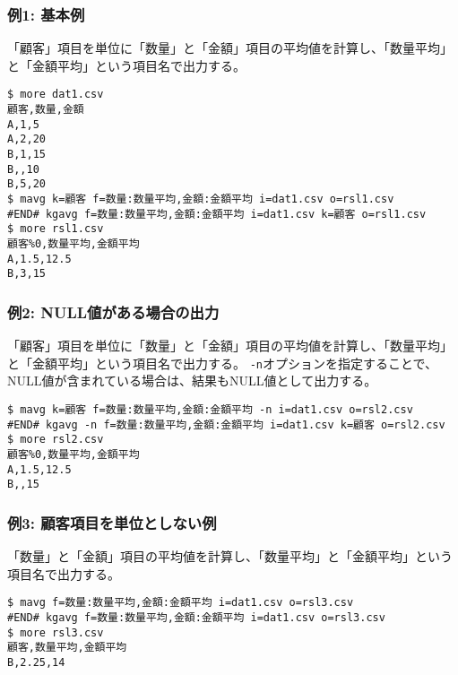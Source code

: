 \subsubsection*{例1: 基本例}

「顧客」項目を単位に「数量」と「金額」項目の平均値を計算し、「数量平均」と「金額平均」という項目名で出力する。


\begin{Verbatim}[baselinestretch=0.7,frame=single]
$ more dat1.csv
顧客,数量,金額
A,1,5
A,2,20
B,1,15
B,,10
B,5,20
$ mavg k=顧客 f=数量:数量平均,金額:金額平均 i=dat1.csv o=rsl1.csv
#END# kgavg f=数量:数量平均,金額:金額平均 i=dat1.csv k=顧客 o=rsl1.csv
$ more rsl1.csv
顧客%0,数量平均,金額平均
A,1.5,12.5
B,3,15
\end{Verbatim}
\subsubsection*{例2: NULL値がある場合の出力}

「顧客」項目を単位に「数量」と「金額」項目の平均値を計算し、「数量平均」と「金額平均」という項目名で出力する。
\verb|-n|オプションを指定することで、NULL値が含まれている場合は、結果もNULL値として出力する。


\begin{Verbatim}[baselinestretch=0.7,frame=single]
$ mavg k=顧客 f=数量:数量平均,金額:金額平均 -n i=dat1.csv o=rsl2.csv
#END# kgavg -n f=数量:数量平均,金額:金額平均 i=dat1.csv k=顧客 o=rsl2.csv
$ more rsl2.csv
顧客%0,数量平均,金額平均
A,1.5,12.5
B,,15
\end{Verbatim}
\subsubsection*{例3: 顧客項目を単位としない例}

「数量」と「金額」項目の平均値を計算し、「数量平均」と「金額平均」という項目名で出力する。


\begin{Verbatim}[baselinestretch=0.7,frame=single]
$ mavg f=数量:数量平均,金額:金額平均 i=dat1.csv o=rsl3.csv
#END# kgavg f=数量:数量平均,金額:金額平均 i=dat1.csv o=rsl3.csv
$ more rsl3.csv
顧客,数量平均,金額平均
B,2.25,14
\end{Verbatim}
